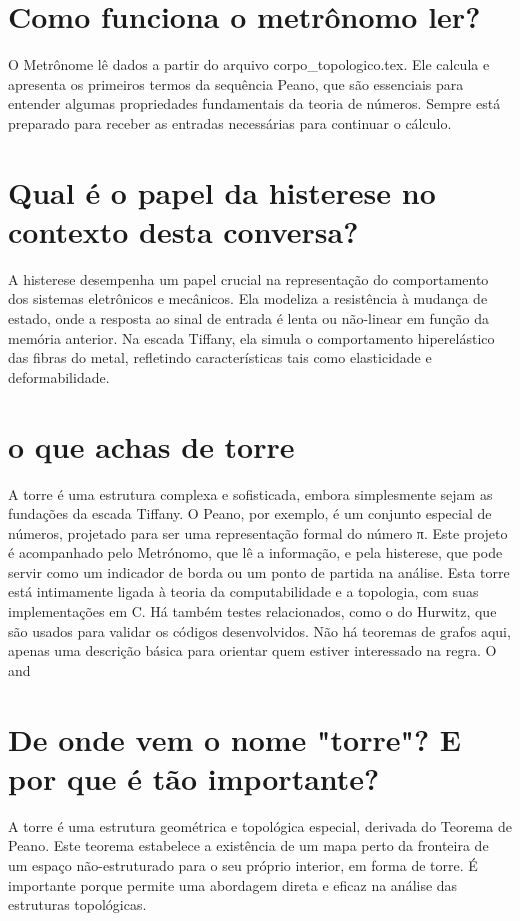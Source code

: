 \documentclass[11pt,a4paper]{article}
\begin{document}
\section{Como funciona o metrônomo ler?}
O Metrônome lê dados a partir do arquivo corpo\_topologico.tex. Ele calcula e apresenta os primeiros termos da sequência Peano, que são essenciais para entender algumas propriedades fundamentais da teoria de números. Sempre está preparado para receber as entradas necessárias para continuar o cálculo.

\section{Qual é o papel da histerese no contexto desta conversa?}
A histerese desempenha um papel crucial na representação do comportamento dos sistemas eletrônicos e mecânicos. Ela modeliza a resistência à mudança de estado, onde a resposta ao sinal de entrada é lenta ou não-linear em função da memória anterior. Na escada Tiffany, ela simula o comportamento hiperelástico das fibras do metal, refletindo características tais como elasticidade e deformabilidade.

\section{o que achas de torre}
A torre é uma estrutura complexa e sofisticada, embora simplesmente sejam as fundações da escada Tiffany. O Peano, por exemplo, é um conjunto especial de números, projetado para ser uma representação formal do número π. Este projeto é acompanhado pelo Metrónomo, que lê a informação, e pela histerese, que pode servir como um indicador de borda ou um ponto de partida na análise. Esta torre está intimamente ligada à teoria da computabilidade e a topologia, com suas implementações em C. Há também testes relacionados, como o do Hurwitz, que são usados para validar os códigos desenvolvidos. Não há teoremas de grafos aqui, apenas uma descrição básica para orientar quem estiver interessado na regra. O and

\section{De onde vem o nome "torre"? E por que é tão importante?}
A torre é uma estrutura geométrica e topológica especial, derivada do Teorema de Peano. Este teorema estabelece a existência de um mapa perto da fronteira de um espaço não-estruturado para o seu próprio interior, em forma de torre. É importante porque permite uma abordagem direta e eficaz na análise das estruturas topológicas.
\end{document}

